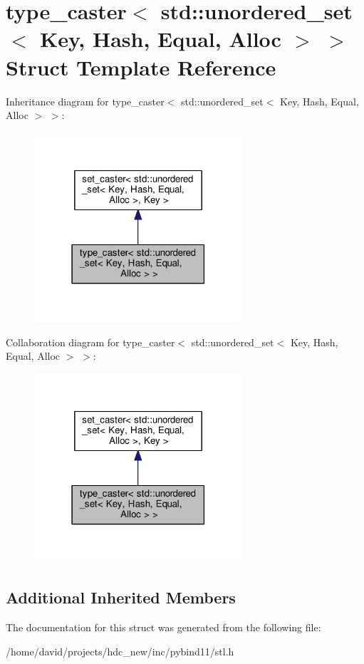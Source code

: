 \hypertarget{structtype__caster_3_01std_1_1unordered__set_3_01_key_00_01_hash_00_01_equal_00_01_alloc_01_4_01_4}{}\section{type\+\_\+caster$<$ std\+:\+:unordered\+\_\+set$<$ Key, Hash, Equal, Alloc $>$ $>$ Struct Template Reference}
\label{structtype__caster_3_01std_1_1unordered__set_3_01_key_00_01_hash_00_01_equal_00_01_alloc_01_4_01_4}


Inheritance diagram for type\+\_\+caster$<$ std\+:\+:unordered\+\_\+set$<$ Key, Hash, Equal, Alloc $>$ $>$\+:
\nopagebreak
\begin{figure}[H]
\begin{center}
\leavevmode
\includegraphics[width=219pt]{structtype__caster_3_01std_1_1unordered__set_3_01_key_00_01_hash_00_01_equal_00_01_alloc_01_4_01_4__inherit__graph}
\end{center}
\end{figure}


Collaboration diagram for type\+\_\+caster$<$ std\+:\+:unordered\+\_\+set$<$ Key, Hash, Equal, Alloc $>$ $>$\+:
\nopagebreak
\begin{figure}[H]
\begin{center}
\leavevmode
\includegraphics[width=219pt]{structtype__caster_3_01std_1_1unordered__set_3_01_key_00_01_hash_00_01_equal_00_01_alloc_01_4_01_4__coll__graph}
\end{center}
\end{figure}
\subsection*{Additional Inherited Members}


The documentation for this struct was generated from the following file\+:\begin{DoxyCompactItemize}
\item 
/home/david/projects/hdc\+\_\+new/inc/pybind11/stl.\+h\end{DoxyCompactItemize}
